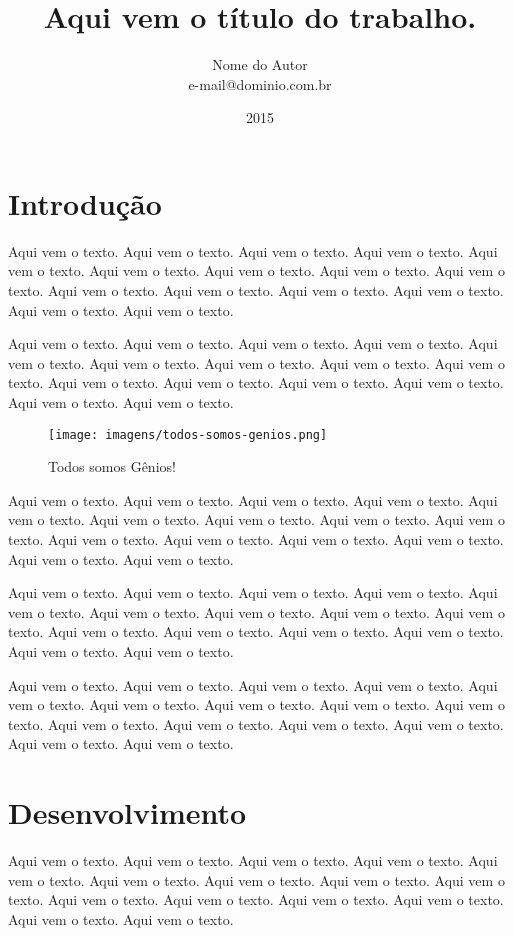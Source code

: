 \documentclass[a4paper, 12pt]{article}
\title{Aqui vem o título do trabalho. }
\author{Nome do Autor \\ e-mail@dominio.com.br}
\date{2015}
\begin{document}
\maketitle
\tableofcontents \newpage
\listoffigures \newpage
\section{Introdução}

Aqui vem o texto. Aqui vem o texto. Aqui vem o texto. Aqui vem o texto. Aqui vem o texto. Aqui vem o texto. Aqui vem o texto. Aqui vem o texto. Aqui vem o texto. Aqui vem o texto. Aqui vem o texto. Aqui vem o texto. Aqui vem o texto. Aqui vem o texto. Aqui vem o texto.

Aqui vem o texto. Aqui vem o texto. Aqui vem o texto. Aqui vem o texto. Aqui vem o texto. Aqui vem o texto. Aqui vem o texto. Aqui vem o texto. Aqui vem o texto. Aqui vem o texto. Aqui vem o texto. Aqui vem o texto. Aqui vem o texto. Aqui vem o texto. Aqui vem o texto.

\begin{figure}[htb]
\centering
\texttt{[image: imagens/todos-somos-genios.png]}
\caption{Todos somos Gênios!}
\label{figura-genios}
\end{figure}

Aqui vem o texto. Aqui vem o texto. Aqui vem o texto. Aqui vem o texto. Aqui vem o texto. Aqui vem o texto. Aqui vem o texto. Aqui vem o texto. Aqui vem o texto. Aqui vem o texto. Aqui vem o texto. Aqui vem o texto. Aqui vem o texto. Aqui vem o texto. Aqui vem o texto.

Aqui vem o texto. Aqui vem o texto. Aqui vem o texto. Aqui vem o texto. Aqui vem o texto. Aqui vem o texto. Aqui vem o texto. Aqui vem o texto. Aqui vem o texto. Aqui vem o texto. Aqui vem o texto. Aqui vem o texto. Aqui vem o texto. Aqui vem o texto. Aqui vem o texto.

Aqui vem o texto. Aqui vem o texto. Aqui vem o texto. Aqui vem o texto. Aqui vem o texto. Aqui vem o texto. Aqui vem o texto. Aqui vem o texto. Aqui vem o texto. Aqui vem o texto. Aqui vem o texto. Aqui vem o texto. Aqui vem o texto. Aqui vem o texto. Aqui vem o texto.

\section{Desenvolvimento}

Aqui vem o texto. Aqui vem o texto. Aqui vem o texto. Aqui vem o texto. Aqui vem o texto. Aqui vem o texto. Aqui vem o texto. Aqui vem o texto. Aqui vem o texto. Aqui vem o texto. Aqui vem o texto. Aqui vem o texto. Aqui vem o texto. Aqui vem o texto. Aqui vem o texto.
\end{document}
